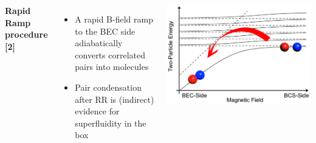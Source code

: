 \documentclass[26pt, paperwidth=36in,paperheight=48in]{tikzposter} %
\newcommand{\myfont}{\fontsize{26}{36}\selectfont}
\begin{document}

\begin{columns} 
	
	
	
	
	\block[roundedcorners=0]{\textcolor{BEC1blue}{Clogston-Chandrasekhar limit measurement}}
	{
		\begin{minipage}{0.20\textwidth}
			\flushleft
			\vspace{0.5cm}
			\textbf{Rapid Ramp procedure [2]}
			\vspace{0.5cm}
			\myfont
			\begin{itemize}
				\item A rapid B-field ramp to the BEC side adiabatically converts correlated pairs into molecules 
				\item Pair condensation after RR is (indirect) evidence for superfluidity in the box
											
			\end{itemize}
		\end{minipage}
		\hspace{2.0cm}
		\begin{minipage}{0.17\textwidth}
			\vspace{0.5cm}
			\hspace{1.0cm}
			\includegraphics[width=1.1\textwidth]{figures_retreat/rapid_ramp.png}
		\end{minipage}
		\vspace{1.0cm}
		
}
\end{columns}
\end{document}
